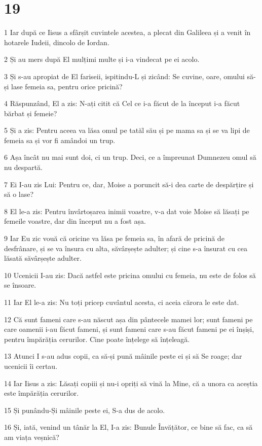 \chapter{19}

\par 1 Iar după ce Iisus a sfârșit cuvintele acestea, a plecat din Galileea și a venit în hotarele Iudeii, dincolo de Iordan.
\par 2 Și au mers după El mulțimi multe și i-a vindecat pe ei acolo.
\par 3 Și s-au apropiat de El fariseii, ispitindu-L și zicând: Se cuvine, oare, omului să-și lase femeia sa, pentru orice pricină?
\par 4 Răspunzând, El a zis: N-ați citit că Cel ce i-a făcut de la început i-a făcut bărbat și femeie?
\par 5 Și a zis: Pentru aceea va lăsa omul pe tatăl său și pe mama sa și se va lipi de femeia sa și vor fi amândoi un trup.
\par 6 Așa încât nu mai sunt doi, ci un trup. Deci, ce a împreunat Dumnezeu omul să nu despartă.
\par 7 Ei I-au zis Lui: Pentru ce, dar, Moise a poruncit să-i dea carte de despărțire și să o lase?
\par 8 El le-a zis: Pentru învârtoșarea inimii voastre, v-a dat voie Moise să lăsați pe femeile voastre, dar din început nu a fost așa.
\par 9 Iar Eu zic vouă că oricine va lăsa pe femeia sa, în afară de pricină de desfrânare, și se va însura cu alta, săvârșește adulter; și cine s-a însurat cu cea lăsată săvârșește adulter.
\par 10 Ucenicii I-au zis: Dacă astfel este pricina omului cu femeia, nu este de folos să se însoare.
\par 11 Iar El le-a zis: Nu toți pricep cuvântul acesta, ci aceia cărora le este dat.
\par 12 Că sunt fameni care s-au născut așa din pântecele mamei lor; sunt fameni pe care oamenii i-au făcut fameni, și sunt fameni care s-au făcut fameni pe ei înșiși, pentru împărăția cerurilor. Cine poate înțelege să înțeleagă.
\par 13 Atunci I s-au adus copii, ca să-și pună mâinile peste ei și să Se roage; dar ucenicii îi certau.
\par 14 Iar Iisus a zis: Lăsați copiii și nu-i opriți să vină la Mine, că a unora ca aceștia este împărăția cerurilor.
\par 15 Și punându-Și mâinile peste ei, S-a dus de acolo.
\par 16 Și, iată, venind un tânăr la El, I-a zis: Bunule Învățător, ce bine să fac, ca să am viața veșnică?
